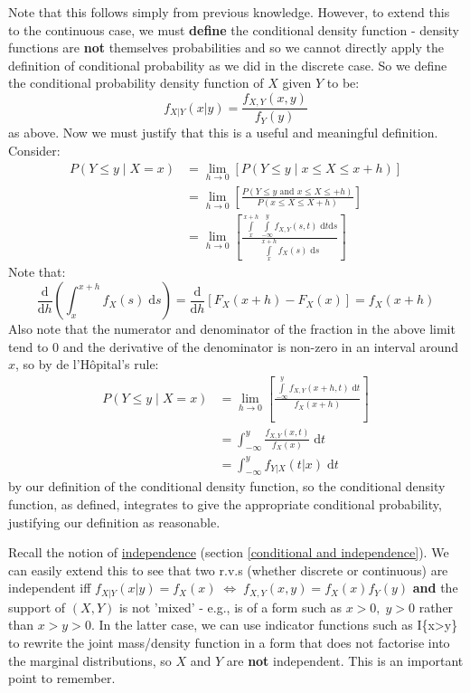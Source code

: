 \documentclass[12pt,a4paper]{article}
\newcommand{\diff}{\mathrm{d}}
\begin{document}
Note that this follows simply from previous knowledge. However, to extend this to the continuous case, we must \textbf{define} the conditional density function - density functions are \textbf{not} themselves probabilities and so we cannot directly apply the definition of conditional probability as we did in the discrete case. So we define the conditional probability density function of $X$ given $Y$ to be:
$$f_{X|Y}(x|y) = \frac{f_{X,Y}(x,y)}{f_Y(y)}$$
as above. Now we must justify that this is a useful and meaningful definition. Consider:
\begin{align*}
P(Y\leq y\; | \; X=x) &= \lim_{h\rightarrow 0} [P(Y\leq y\; | \; x\leq X\leq x+h)]\\
&= \lim_{h\rightarrow 0} \left[\frac{P(Y\leq y \text{ and } x\leq X \leq +h)}{P(x\leq X \leq X+h)}\right]\\
&= \lim_{h\rightarrow 0} \left[\frac{\int\limits_x^{x+h}\!\!\int\limits_{-\infty}^y\!\! f_{X,Y}(s,t)\;\diff t\diff s}{\int\limits_x^{x+h}\!\! f_X(s)\;\diff s}\right]
\end{align*}
Note that:
$$\frac{\diff}{\diff h}\!\left(\int_x^{x+h}\!\!\!\!f_X(s)\;\diff s\right) = \frac{\diff}{\diff h}\!\left[F_X(x+h)-F_X(x)\right] = f_X\!(x+h)$$
Also note that the numerator and denominator of the fraction in the above limit tend to 0 and the derivative of the denominator is non-zero in an interval around $x$, so by de l'H\^opital's rule:
\begin{align*}
P(Y\leq y\; | \; X=x) &= \lim_{h\rightarrow 0}\left[\frac{\int\limits_{-\infty}^y\!\! f_{X,Y}(x+h,t)\;\diff t}{f_X(x+h)}\right]\\
&= \int_{-\infty}^y\!\!\frac{f_{X,Y}(x,t)}{f_X(x)}\;\diff t\\
&= \int_{-\infty}^y\!\! f_{Y|X}(t|x)\;\diff t
\end{align*}
by our definition of the conditional density function, so the conditional density function, as defined, integrates to give the appropriate conditional probability, justifying our definition as reasonable.

Recall the notion of \underline{independence} (section \ref{conditional and independence}). We can easily extend this to see that two r.v.s (whether discrete or continuous) are independent iff $f_{X|Y}(x|y) = f_X(x) \; \Leftrightarrow \; f_{X,Y}(x,y) = f_X(x)f_Y(y)$ \textbf{and} the support of $(X,Y)$ is not 'mixed' - e.g., is of a form such as $x>0,\; y>0$ rather than $x>y>0$. In the latter case, we can use indicator functions such as I\{x>y\} to rewrite the joint mass/density function in a form that does not factorise into the marginal distributions, so $X$ and $Y$ are \textbf{not} independent. This is an important point to remember.
\end{document}
